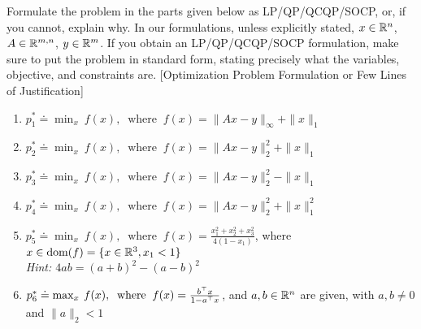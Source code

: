 \rm

Formulate the problem in the parts given below as LP/QP/QCQP/SOCP, or, if you cannot, explain why. 
In our formulations, unless explicitly stated, $x \in \mathbb{R}^{n}$, $A \in \mathbb{R}^{m,n}$, $y \in \mathbb{R}^{m}$. If you obtain an LP/QP/QCQP/SOCP formulation, make sure to put the problem in standard form, stating precisely what the variables, objective, and constraints are. 
\newline
\newline
{[Optimization Problem Formulation or Few Lines of Justification]}

\begin{enumerate}
    \item $p_1^* \doteq \min_x \: f(x),\;\;\text{where}\;\; f(x) = \|Ax-y\|_\infty +\|x\|_1$
    \item $p_2^* \doteq \min_x \: f(x),\;\;\text{where}\;\; f(x) = \|Ax-y\|_2^2 + \|x\|_1$ 
    \item $p_3^* \doteq \min_x \: f(x),\;\;\text{where}\;\; f(x) = \|Ax-y\|_2^2 - \|x\|_1$
    \item $p_4^* \doteq \min_x \: f(x),\;\;\text{where}\;\; f(x) = \|Ax-y\|_2^2 + \|x\|_1^2$ 
    \item $p_5^* \doteq \min_x \: f(x),\;\;\text{where}\;\; f(x) = \frac{x_1^2+x_2^2+x_3^2}{4(1-x_1)}$, where $x\in \text{dom}(f) = \{x\in \mathbb{R}^{3}, x_1 < 1\}$ \\%
    \textit{Hint: $4ab = (a+b)^2 - (a-b)^2$}
    \item $p_6^* \doteq \max_x \: f(x), \;\;\text{where}\;\;f(x) = \frac{b^{\top} x}{1-a^{\top} x}$, and $a,b \in \mathbb{R}^{n}$ are given, with $a,b \ne 0$ and $\|a\|_2 < 1$
\end{enumerate}
\sol{
    
}